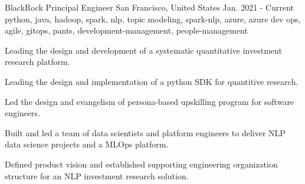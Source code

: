 \cventry
    {BlackRock} %
    {Principal Engineer} %
    {San Francisco, United States} %
    {Jan. 2021 - Current} %
    { python, java, hadoop, spark, nlp, topic modeling, spark-nlp, azure, azure dev ops, agile, gitops, pants, development-management, people-management} %
    {
    \begin{cvitems} %
       \item { Leading the design and development of a systematic quantitative investment research platform. }
       \item { Leading the design and implementation of a python SDK for quantitive research. }
       \item { Led the design and evangelism of persona-based upskilling program for software engineers. }
       \item { Built and led a team of data scientists and platform engineers to deliver NLP data science projects and a MLOps platform. }
       \item { Defined product vision and established supporting engineering organization structure for an NLP investment research solution. }
    \end{cvitems}
    }
